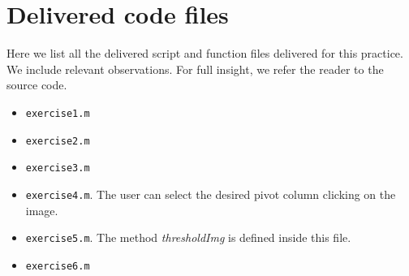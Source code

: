 \section{Delivered code files}

Here we list all the delivered script and function files delivered for this practice.
We include relevant observations. For full insight, we refer the reader to the
source code.

\begin{itemize}
	\item \texttt{exercise1.m}
	\item \texttt{exercise2.m}
	\item \texttt{exercise3.m}
	\item \texttt{exercise4.m}. The user can select the desired pivot column clicking on the image.
	\item \texttt{exercise5.m}. The method \emph{thresholdImg} is defined inside this file.
	\item \texttt{exercise6.m}
\end{itemize}
